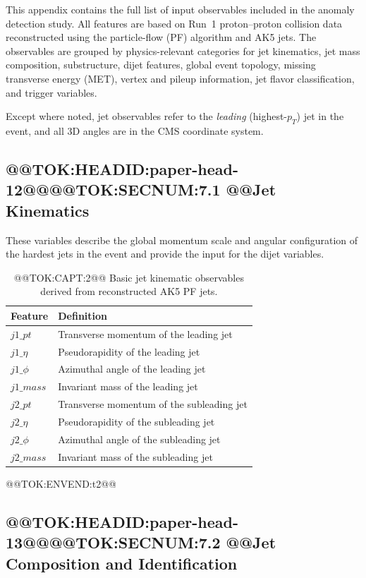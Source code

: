 \documentclass[11pt]{article}
\begin{document}
This appendix contains the full list of input observables included in the anomaly detection study. 
All features are based on Run~1 proton--proton collision data reconstructed using the particle-flow (PF) algorithm and AK5 jets.
The observables are grouped by physics-relevant categories for jet kinematics, jet mass composition, substructure, dijet features, global event topology, missing transverse energy (MET), vertex and pileup information, jet flavor classification, and trigger variables.

Except where noted, jet observables refer to the \emph{leading} (highest-$p_T$) jet in the event, and all 3D angles are in the CMS coordinate system.

\subsection{@@TOK:HEADID:paper-head-12@@@@TOK:SECNUM:7.1 @@Jet Kinematics}
These variables describe the global momentum scale and angular configuration of the hardest jets in the event and provide the input for the dijet variables.

\begin{table}[h]
\centering
\caption{@@TOK:CAPT:2@@ Basic jet kinematic observables derived from reconstructed AK5 PF jets.}
\footnotesize

\begin{tabular}{ll}
\toprule
Feature & Definition \\
\midrule
$j1\_pt$   & Transverse momentum of the leading jet \\
$j1\_\eta$ & Pseudorapidity of the leading jet \\
$j1\_\phi$ & Azimuthal angle of the leading jet \\
$j1\_mass$ & Invariant mass of the leading jet \\
$j2\_pt$   & Transverse momentum of the subleading jet \\
$j2\_\eta$ & Pseudorapidity of the subleading jet \\
$j2\_\phi$ & Azimuthal angle of the subleading jet \\
$j2\_mass$ & Invariant mass of the subleading jet \\
\bottomrule
\end{tabular}

@@TOK:ENVEND:t2@@\end{table}

\subsection{@@TOK:HEADID:paper-head-13@@@@TOK:SECNUM:7.2 @@Jet Composition and Identification}
\end{document}
